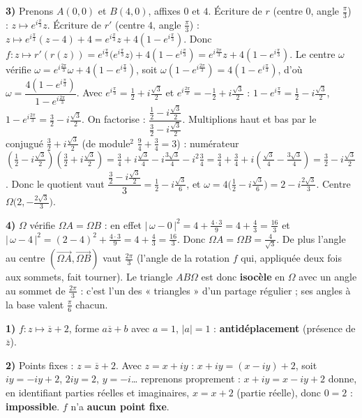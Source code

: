 \textbf{3)} Prenons $A(0,0)$ et $B(4,0)$, affixes $0$ et $4$. Écriture de $r$ (centre $0$, angle $\frac\pi3$) : $z\mapsto e^{i\frac\pi3}z$. Écriture de $r'$ (centre $4$, angle $\frac\pi3$) : $z\mapsto e^{i\frac\pi3}(z-4)+4=e^{i\frac\pi3}z+4(1-e^{i\frac\pi3})$. Donc
$f:z\mapsto r'(r(z))=e^{i\frac\pi3}\big(e^{i\frac\pi3}z\big)+4(1-e^{i\frac\pi3})=e^{i\frac{2\pi}3}z+4(1-e^{i\frac\pi3})$.
Le centre $\omega$ vérifie $\omega=e^{i\frac{2\pi}3}\omega+4(1-e^{i\frac\pi3})$, soit $\omega(1-e^{i\frac{2\pi}3})=4(1-e^{i\frac\pi3})$, d'où
$\omega=\dfrac{4(1-e^{i\frac\pi3})}{1-e^{i\frac{2\pi}3}}$.
Avec $e^{i\frac\pi3}=\tfrac12+i\tfrac{\sqrt3}2$ et $e^{i\frac{2\pi}3}=-\tfrac12+i\tfrac{\sqrt3}2$ :
$1-e^{i\frac\pi3}=\tfrac12-i\tfrac{\sqrt3}2$, $1-e^{i\frac{2\pi}3}=\tfrac32-i\tfrac{\sqrt3}2$.
On factorise : $\dfrac{\tfrac12-i\tfrac{\sqrt3}2}{\tfrac32-i\tfrac{\sqrt3}2}$. Multiplions haut et bas par le conjugué $\tfrac32+i\tfrac{\sqrt3}2$ (de module$^2$ $\tfrac94+\tfrac34=3$) :
numérateur $(\tfrac12-i\tfrac{\sqrt3}2)(\tfrac32+i\tfrac{\sqrt3}2)=\tfrac34+i\tfrac{\sqrt3}4-i\tfrac{3\sqrt3}4-i^2\tfrac34=\tfrac34+\tfrac34+i(\tfrac{\sqrt3}4-\tfrac{3\sqrt3}4)=\tfrac32-i\tfrac{\sqrt3}2$.
Donc le quotient vaut $\dfrac{\tfrac32-i\tfrac{\sqrt3}2}{3}=\tfrac12-i\tfrac{\sqrt3}6$, et $\omega=4\big(\tfrac12-i\tfrac{\sqrt3}6\big)=2-i\tfrac{2\sqrt3}3$. Centre $\Omega\big(2,-\tfrac{2\sqrt3}3\big)$.

\textbf{4)} $\Omega$ vérifie $\Omega A=\Omega B$ : en effet $|\,\omega-0\,|^2=4+\tfrac{4\cdot3}9=4+\tfrac43=\tfrac{16}3$ et $|\,\omega-4\,|^2=(2-4)^2+\tfrac{4\cdot3}9=4+\tfrac43=\tfrac{16}3$. Donc $\Omega A=\Omega B=\tfrac4{\sqrt3}$. De plus l'angle au centre $(\overrightarrow{\Omega A},\overrightarrow{\Omega B})$ vaut $\frac{2\pi}3$ (l'angle de la rotation $f$ qui, appliquée deux fois aux sommets, fait tourner). Le triangle $AB\Omega$ est donc \textbf{isocèle} en $\Omega$ avec un angle au sommet de $\frac{2\pi}3$ : c'est l'un des « triangles » d'un partage régulier ; ses angles à la base valent $\frac\pi6$ chacun.

\textbf{1)} $f:z\mapsto\overline z+2$, forme $a\overline z+b$ avec $a=1$, $|a|=1$ : \textbf{antidéplacement} (présence de $\overline z$).

\textbf{2)} Points fixes : $z=\overline z+2$. Avec $z=x+iy$ : $x+iy=(x-iy)+2$, soit $iy=-iy+2$, $2iy=2$, $y=-i$… reprenons proprement : $x+iy = x - iy + 2$ donne, en identifiant parties réelles et imaginaires, $x=x+2$ (partie réelle), donc $0=2$ : \textbf{impossible}. $f$ n'a \textbf{aucun point fixe}.

